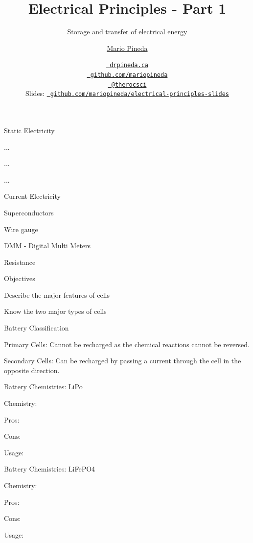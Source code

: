 \documentclass[12pt,t]{beamer}
\title{Electrical Principles - Part 1}
\subtitle{Storage and transfer of electrical energy}
\author{\href{www.drpineda.ca}{Mario Pineda}}
\institute{Queen Elizabeth High School}
\date{\href{www.drpineda.ca}{\tt \scriptsize \color{foreground} drpineda.ca}
\\[-4pt]
\href{https://github.com/mariopineda}{\tt \scriptsize \color{foreground} github.com/mariopineda}
\\[-4pt]
\href{https://twitter.com/therocsci}{\tt \scriptsize \color{foreground} @therocsci}
\\[2pt]
\scriptsize {\lolit Slides:} \href{https://github.com/mariopineda/electrical-principles-slides}{\tt \scriptsize
  \color{foreground} github.com/mariopineda/electrical-principles-slides}
}
\begin{document}
{
}

\begin{frame}[c]{Static Electricity}
\vspace{-20mm}
\bbi
\item ... 
\item ...
\item ...
\ei
\end{frame}

\begin{frame}[c]{Current Electricity}
\vspace{-20mm}
\bbi
\item Superconductors
\item Wire gauge
\item DMM - Digital Multi Meters 
\item Resistance
\ei
\end{frame}

\begin{frame}[c]{Objectives}
\bbi 
\item Describe the major features of cells
\item Know the two major types of cells
\item 
\end{frame}

\begin{frame}[c]{Battery Classification}
\bbi
\item Primary Cells: Cannot be recharged as the chemical reactions cannot be reversed.
\item Secondary Cells: Can be recharged by passing a current through the cell in the opposite direction.
\ei
\end{frame}

\begin{frame}[c]{Battery Chemistries: LiPo }
\bbi
\item Chemistry:
\item Pros: 
\item Cons:
\item Usage:
\ei
\end{frame}

\begin{frame}[c]{Battery Chemistries: LiFePO4 }
\bbi    
\item Chemistry:
\item Pros:     
\item Cons:
\item Usage:
\ei     
\end{frame}
\end{document}
